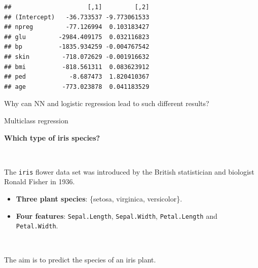 \documentclass[10pt,ignorenonframetext,]{beamer}
\providecommand{\tightlist}{%
  \setlength{\itemsep}{0pt}\setlength{\parskip}{0pt}}
\begin{document}
\begin{frame}[fragile]
\begin{verbatim}
##                     [,1]         [,2]
## (Intercept)   -36.733537 -9.773061533
## npreg         -77.126994  0.103183427
## glu         -2984.409175  0.032116823
## bp          -1835.934259 -0.004767542
## skin         -718.072629 -0.001916632
## bmi          -818.561311  0.083623912
## ped            -8.687473  1.820410367
## age          -773.023878  0.041183529
\end{verbatim}

\end{frame}

\begin{frame}

Why can NN and logistic regression lead to such different results?

\end{frame}

\begin{frame}[fragile]{Multiclass regression}
\protect\hypertarget{multiclass-regression}{}

\textbf{Which type of iris species?}

\(~\)

The \texttt{iris} flower data set was introduced by the British
statistician and biologist Ronald Fisher in 1936.

\begin{itemize}
\tightlist
\item
  \textbf{Three plant species}: \{setosa, virginica, versicolor\}.
\item
  \textbf{Four features}: \texttt{Sepal.Length}, \texttt{Sepal.Width},
  \texttt{Petal.Length} and \texttt{Petal.Width}.
\end{itemize}

\(~\)

The aim is to predict the species of an iris plant.

\end{frame}
\end{document}
